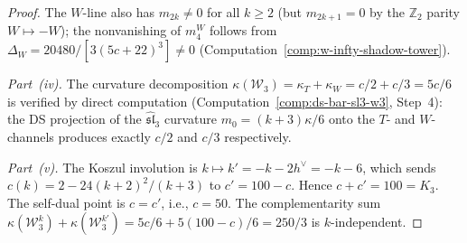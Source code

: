 \begin{proof}
The $W$-line also has $m_{2k} \neq 0$ for all $k \geq 2$ (but
$m_{2k+1} = 0$ by the $\mathbb{Z}_2$ parity $W \mapsto -W$);
the nonvanishing of $m_4^W$ follows from
$\Delta_W = 20480/[3(5c{+}22)^3] \neq 0$
(Computation~\ref{comp:w-infty-shadow-tower}).

\emph{Part~(iv).} The curvature decomposition
$\kappa(\mathcal{W}_3) = \kappa_T + \kappa_W = c/2 + c/3 = 5c/6$
is verified by direct computation
(Computation~\ref{comp:ds-bar-sl3-w3}, Step~4): the
DS projection of the $\widehat{\mathfrak{sl}}_3$ curvature
$m_0 = (k{+}3)\kappa/6$ onto the $T$- and $W$-channels produces
exactly $c/2$ and $c/3$ respectively.

\emph{Part~(v).} The Koszul involution is
$k \mapsto k' = -k - 2h^\vee = -k - 6$, which sends
$c(k) = 2 - 24(k{+}2)^2/(k{+}3)$ to $c' = 100 - c$. Hence
$c + c' = 100 = K_3$.
The self-dual point is $c = c'$, i.e., $c = 50$.
The complementarity sum
$\kappa(\mathcal{W}_3^k) + \kappa(\mathcal{W}_3^{k'})
= 5c/6 + 5(100{-}c)/6 = 250/3$
is $k$-independent.
\end{proof}

